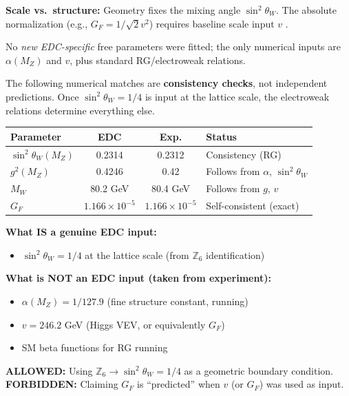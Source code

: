 \textbf{Scale vs.\ structure:} Geometry fixes the mixing angle $\sin^2\theta_W$.
The absolute normalization (e.g., $G_F = 1/\sqrt{2}v^2$) requires baseline scale
input $v$ \tagBL{}.

No \emph{new EDC-specific} free parameters were fitted; the only numerical inputs
are \tagBL{} $\alpha(M_Z)$ and \tagBL{} $v$, plus standard RG/electroweak relations.


\begin{tcolorbox}[colback=cyan!5!white, colframe=cyan!50!black,
    title=\textbf{Consistency Check: Numerical Agreements (Not Independent Predictions)}]

The following numerical matches are \textbf{consistency checks}, not independent
predictions. Once $\sin^2\theta_W = 1/4$ is input at the lattice scale, the
electroweak relations determine everything else.

\begin{center}
\begin{tabular}{lccl}
\toprule
\textbf{Parameter} & \textbf{EDC} & \textbf{Exp.} & \textbf{Status} \\
\midrule
$\sin^2\theta_W(M_Z)$ & 0.2314 & 0.2312 & Consistency (RG) \\
$g^2(M_Z)$ & 0.4246 & 0.42 & Follows from $\alpha$, $\sin^2\theta_W$ \\
$M_W$ & 80.2 GeV & 80.4 GeV & Follows from $g$, $v$ \\
$G_F$ & $1.166 \times 10^{-5}$ & $1.166 \times 10^{-5}$ & Self-consistent (exact) \\
\bottomrule
\end{tabular}
\end{center}

\textbf{What IS a genuine EDC input:}
\begin{itemize}[nosep]
    \item $\sin^2\theta_W = 1/4$ at the lattice scale (from $\mathbb{Z}_6$ identification) \tagI{}
\end{itemize}

\textbf{What is NOT an EDC input (taken from experiment):}
\begin{itemize}[nosep]
    \item $\alpha(M_Z) = 1/127.9$ (fine structure constant, running) \tagBL{}
    \item $v = 246.2$ GeV (Higgs VEV, or equivalently $G_F$) \tagBL{}
    \item SM beta functions for RG running \tagBL{}
\end{itemize}

\textbf{ALLOWED:} Using $\mathbb{Z}_6 \to \sin^2\theta_W = 1/4$ as a geometric boundary condition.\\
\textbf{FORBIDDEN:} Claiming $G_F$ is ``predicted'' when $v$ (or $G_F$) was used as input.
\end{tcolorbox}

